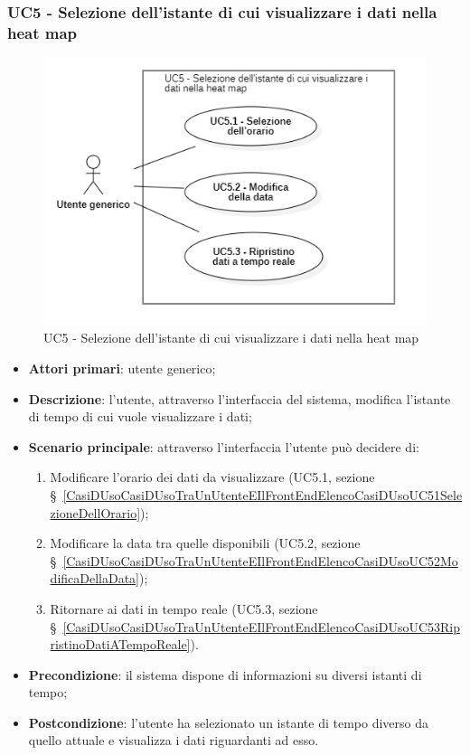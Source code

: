 \subsubsection{UC5 - Selezione dell’istante di cui visualizzare i dati nella heat map
}\label{CasiDUsoCasiDUsoTraUnUtenteEIlFrontEndElencoCasiDUsoUC5SelezioneDellIstanzeDiCuiVisualizzareIDatiNellaHeatmap}%
\begin{center}
	\begin{figure}[H]
		\centering\includegraphics{../immagini/attori_casi/UC5.png}
		\caption{UC5 - Selezione dell’istante di cui visualizzare i dati nella heat map}
	\end{figure}
\end{center}
\begin{itemize}
	\item \textbf{Attori primari}: utente generico;
	\item \textbf{Descrizione}: l’utente, attraverso l’interfaccia del sistema, modifica l’istante di tempo di cui vuole visualizzare i dati;
	\item \textbf{Scenario principale}: attraverso l’interfaccia l’utente può decidere di:
		\begin{enumerate}
			\item Modificare l’orario dei dati da visualizzare (UC5.1, sezione  \S~\ref{CasiDUsoCasiDUsoTraUnUtenteEIlFrontEndElencoCasiDUsoUC51SelezioneDellOrario});
			\item Modificare la data tra quelle disponibili (UC5.2, sezione \S~\ref{CasiDUsoCasiDUsoTraUnUtenteEIlFrontEndElencoCasiDUsoUC52ModificaDellaData});
			\item Ritornare ai dati in tempo reale (UC5.3, sezione \S~\ref{CasiDUsoCasiDUsoTraUnUtenteEIlFrontEndElencoCasiDUsoUC53RipristinoDatiATempoReale}).
		\end{enumerate}
	\item \textbf{Precondizione}: il sistema dispone di informazioni su diversi istanti di tempo;
	\item \textbf{Postcondizione}: l’utente ha selezionato un istante di tempo diverso da quello attuale e visualizza i dati riguardanti ad esso.%
\end{itemize}

